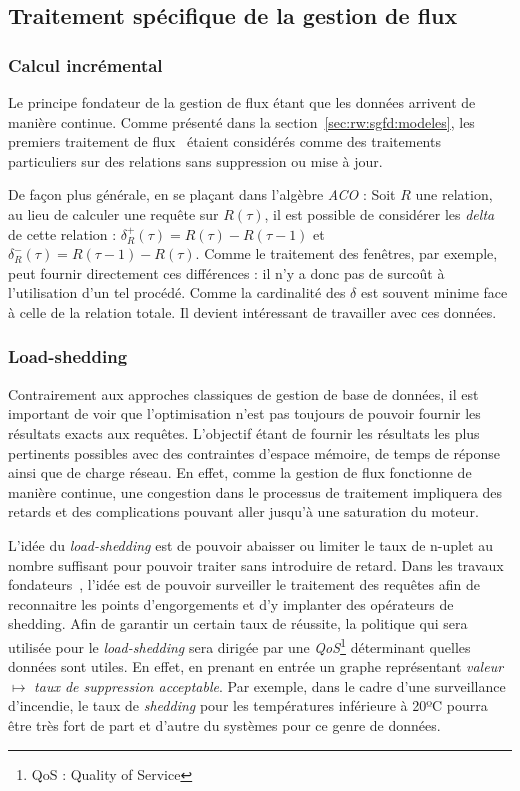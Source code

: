 \subsection{Traitement spécifique de la gestion de flux}
\subsubsection{Calcul incrémental}
Le principe fondateur de la gestion de flux étant que les données arrivent de manière continue. Comme présenté dans la section~\ref{sec:rw:sgfd:modeles}, les premiers traitement de flux~\cite{Terry:tapestry} étaient considérés comme des traitements particuliers sur des relations sans suppression ou mise à jour.

De façon plus générale, en se plaçant dans l'algèbre \textit{ACO} : Soit $R$ une relation, au lieu de calculer une requête sur $R(\tau)$, il est possible de considérer les \textit{delta} de cette relation : $\delta_R^+(\tau) = R(\tau)-R(\tau-1)$ et $\delta_R^-(\tau) = R(\tau-1)-R(\tau)$. Comme le traitement des fenêtres, par exemple, peut fournir directement ces différences : il n'y a donc pas de surcoût à l'utilisation d'un tel procédé. Comme la cardinalité des $\delta$ est souvent minime face à celle de la relation totale. Il devient intéressant de travailler avec ces données.
\subsubsection{Load-shedding}
Contrairement aux approches classiques de gestion de base de données, il est important de voir que l'optimisation n'est pas toujours de pouvoir fournir les résultats exacts aux requêtes. L'objectif étant de fournir les résultats les plus pertinents possibles avec des contraintes d'espace mémoire, de temps de réponse ainsi que de charge réseau. En effet, comme la gestion de flux fonctionne de manière continue, une congestion dans le processus de traitement impliquera des retards et des complications pouvant aller jusqu'à une saturation du moteur.

L'idée du \textit{load-shedding} est de pouvoir abaisser ou limiter le taux de n-uplet au nombre suffisant pour pouvoir traiter sans introduire de retard. Dans les travaux fondateurs~\cite{Tatbul:window,Tatbul:load-shedding}, l'idée est de pouvoir surveiller le traitement des requêtes afin de reconnaitre les points d'engorgements et d'y implanter des opérateurs de shedding. Afin de garantir un certain taux de réussite, la politique qui sera utilisée pour le \textit{load-shedding} sera dirigée par une \textit{QoS}\footnote{QoS : Quality of Service} déterminant quelles données sont utiles. En effet, en prenant en entrée un graphe représentant \textit{valeur} $\mapsto$  \textit{taux de suppression acceptable}. Par exemple, dans le cadre d'une surveillance d'incendie, le taux de \textit{shedding} pour les températures inférieure à 20ºC pourra être très fort de part et d'autre du systèmes pour ce genre de données.



